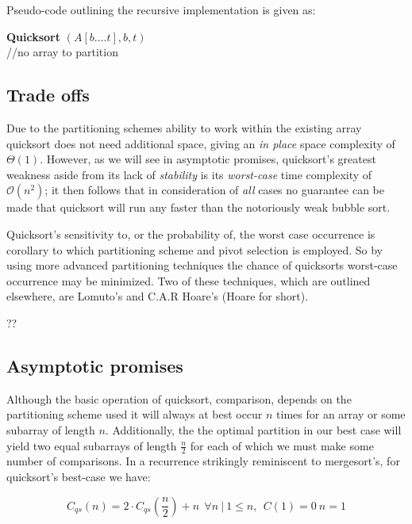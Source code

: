 \documentclass[11pt,letterpaper]{report}
\begin{document}
Pseudo-code outlining the recursive implementation is given as:\\


\begin{algorithm}[H]
\textbf{Quicksort} $(A[b....t], b, t)$ \\
   {//no array to partition}
\end{algorithm}



\subsection*{Trade offs}
Due to the partitioning schemes ability to work within the existing array quicksort does not need additional space, giving an \emph{in place} space complexity of $\Theta(1)$. However, as we will see in asymptotic promises, quicksort's greatest weakness aside from its lack of \emph{stability} is its \emph{worst-case} time complexity of $\mathcal{O}(n^2)$; it then follows that in consideration of \emph{all} cases no guarantee can be made that quicksort will run any faster than the notoriously weak bubble sort.

Quicksort's sensitivity to, or the probability of, the worst case occurrence is corollary to which partitioning scheme and pivot selection is employed. So by using more advanced partitioning techniques the chance of quicksorts worst-case occurrence may be minimized. Two of these techniques, which are outlined elsewhere, are Lomuto's and C.A.R Hoare's (Hoare for short).

??

\subsection*{Asymptotic promises}
Although the basic operation of quicksort, comparison, depends on the partitioning scheme used it will always at best occur $n$ times for an array or some subarray of length $n$. Additionally, the the optimal partition in our best case will yield two equal subarrays of length $\frac{n}{2}$ for each of which we must make some number of comparisons. In a recurrence strikingly reminiscent to mergesort's, for quicksort's best-case we have:

\begin{equation} 
C_{qs}(n)=2 \cdot C_{qs}(\frac{n}{2})+n \ \ \forall n ~| \ 1 \leq n, \ \ C(1) = 0 \ n=1
\end{equation}
\end{document}
